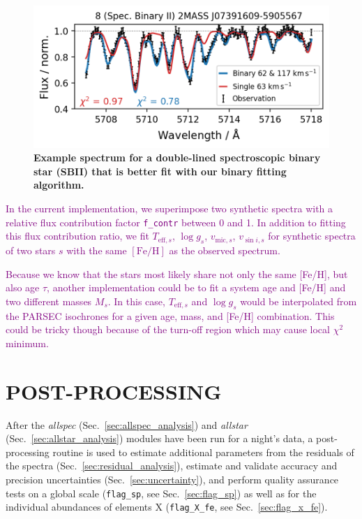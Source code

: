 \documentclass[
  journal=pasa,
  manuscript=research-paper, %
  year=2023,
  volume=37
]{cup-journal}
\newcommand{\SB}[1]{{\textcolor{purple}{#1}}}
\newcommand{\feh}{$\mathrm{[Fe/H]}$\xspace}
\begin{document}
\begin{figure}[ht]
 \centering
 \includegraphics[width=\textwidth]{figures/examples_flag_sp_3.png}
 \caption{\textbf{Example spectrum for a double-lined spectroscopic binary star (SBII) that is better fit with our binary fitting algorithm.}} \label{fig:examples_flag_sp_3}
\end{figure}

\SB{In the current implementation, we superimpose two synthetic spectra with a relative flux contribution factor \texttt{f\_contr} between 0 and 1. In addition to fitting this flux contribution ratio, we fit $T_{\text{eff},s}$, $\log g_s$, $v_{\text{mic},s}$, $v_{\sin i,s}$ for  synthetic spectra of two stars $s$ with the same \feh as the observed spectrum.}

\SB{Because we know that the stars most likely share not only the same [Fe/H], but also age $\tau$, another implementation could be to fit a system age and [Fe/H] and two different masses $M_s$. In this case, $T_{\text{eff},s}$ and $\log g_s$ would be interpolated from the PARSEC isochrones for a given age, mass, and [Fe/H] combination. This could be tricky though because of the turn-off region which may cause local $\chi^2$ minimum.}

\section{POST-PROCESSING}
\label{sec:post_processing}

After the \textit{allspec} (Sec.~\ref{sec:allspec_analysis}) and  \textit{allstar} (Sec.~\ref{sec:allstar_analysis}) modules have been run for a night's data, a post-processing routine is used to estimate additional parameters from the residuals of the spectra (Sec.~\ref{sec:residual_analysis}), estimate and validate accuracy and precision uncertainties (Sec.~\ref{sec:uncertainty}), and perform quality assurance tests on a global scale (\texttt{flag\_sp}, see Sec.~\ref{sec:flag_sp}) as well as for the individual abundances of elements X (\texttt{flag\_X\_fe}, see Sec.~\ref{sec:flag_x_fe}).
\end{document}

